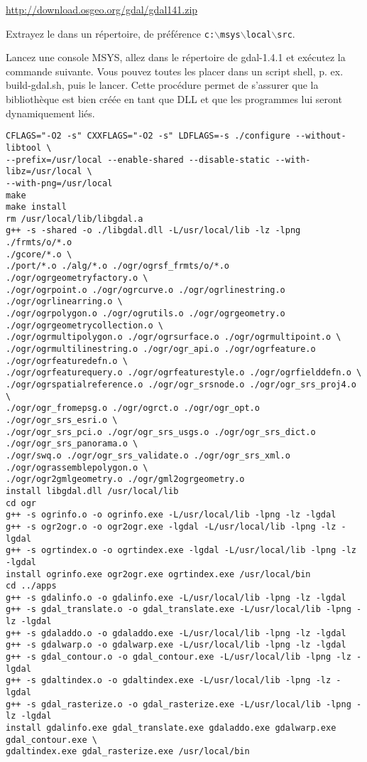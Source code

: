 \url{http://download.osgeo.org/gdal/gdal141.zip}

Extrayez le dans un répertoire, de préférence \texttt{c:$\backslash$msys$\backslash$local$\backslash$src}.

Lancez une console MSYS, allez dans le répertoire de gdal-1.4.1 et exécutez la commande suivante. Vous pouvez toutes les placer dans un script shell, p. ex. build-gdal.sh, puis le lancer. Cette procédure permet de s'assurer que la bibliothèque est bien créée en tant que DLL et que les programmes lui seront dynamiquement liés.

\begin{verbatim}
CFLAGS="-O2 -s" CXXFLAGS="-O2 -s" LDFLAGS=-s ./configure --without-libtool \
--prefix=/usr/local --enable-shared --disable-static --with-libz=/usr/local \
--with-png=/usr/local
make
make install
rm /usr/local/lib/libgdal.a
g++ -s -shared -o ./libgdal.dll -L/usr/local/lib -lz -lpng ./frmts/o/*.o
./gcore/*.o \
./port/*.o ./alg/*.o ./ogr/ogrsf_frmts/o/*.o ./ogr/ogrgeometryfactory.o \
./ogr/ogrpoint.o ./ogr/ogrcurve.o ./ogr/ogrlinestring.o ./ogr/ogrlinearring.o \
./ogr/ogrpolygon.o ./ogr/ogrutils.o ./ogr/ogrgeometry.o
./ogr/ogrgeometrycollection.o \
./ogr/ogrmultipolygon.o ./ogr/ogrsurface.o ./ogr/ogrmultipoint.o \
./ogr/ogrmultilinestring.o ./ogr/ogr_api.o ./ogr/ogrfeature.o
./ogr/ogrfeaturedefn.o \ 
./ogr/ogrfeaturequery.o ./ogr/ogrfeaturestyle.o ./ogr/ogrfielddefn.o \
./ogr/ogrspatialreference.o ./ogr/ogr_srsnode.o ./ogr/ogr_srs_proj4.o \
./ogr/ogr_fromepsg.o ./ogr/ogrct.o ./ogr/ogr_opt.o ./ogr/ogr_srs_esri.o \
./ogr/ogr_srs_pci.o ./ogr/ogr_srs_usgs.o ./ogr/ogr_srs_dict.o
./ogr/ogr_srs_panorama.o \
./ogr/swq.o ./ogr/ogr_srs_validate.o ./ogr/ogr_srs_xml.o
./ogr/ograssemblepolygon.o \
./ogr/ogr2gmlgeometry.o ./ogr/gml2ogrgeometry.o
install libgdal.dll /usr/local/lib
cd ogr
g++ -s ogrinfo.o -o ogrinfo.exe -L/usr/local/lib -lpng -lz -lgdal
g++ -s ogr2ogr.o -o ogr2ogr.exe -lgdal -L/usr/local/lib -lpng -lz -lgdal
g++ -s ogrtindex.o -o ogrtindex.exe -lgdal -L/usr/local/lib -lpng -lz -lgdal
install ogrinfo.exe ogr2ogr.exe ogrtindex.exe /usr/local/bin
cd ../apps
g++ -s gdalinfo.o -o gdalinfo.exe -L/usr/local/lib -lpng -lz -lgdal
g++ -s gdal_translate.o -o gdal_translate.exe -L/usr/local/lib -lpng -lz -lgdal
g++ -s gdaladdo.o -o gdaladdo.exe -L/usr/local/lib -lpng -lz -lgdal
g++ -s gdalwarp.o -o gdalwarp.exe -L/usr/local/lib -lpng -lz -lgdal
g++ -s gdal_contour.o -o gdal_contour.exe -L/usr/local/lib -lpng -lz -lgdal
g++ -s gdaltindex.o -o gdaltindex.exe -L/usr/local/lib -lpng -lz -lgdal
g++ -s gdal_rasterize.o -o gdal_rasterize.exe -L/usr/local/lib -lpng -lz -lgdal
install gdalinfo.exe gdal_translate.exe gdaladdo.exe gdalwarp.exe
gdal_contour.exe \
gdaltindex.exe gdal_rasterize.exe /usr/local/bin

\end{verbatim}

